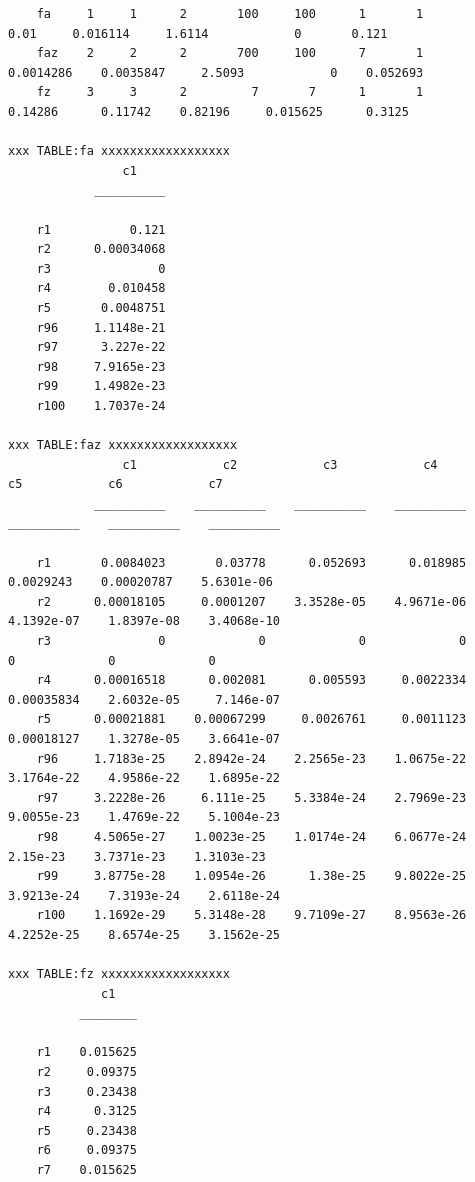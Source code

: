 \documentclass[
]{book}
\begin{document}
\begin{verbatim}
    fa     1     1      2       100     100      1       1          0.01     0.016114     1.6114            0       0.121
    faz    2     2      2       700     100      7       1     0.0014286    0.0035847     2.5093            0    0.052693
    fz     3     3      2         7       7      1       1       0.14286      0.11742    0.82196     0.015625      0.3125

xxx TABLE:fa xxxxxxxxxxxxxxxxxx
                c1    
            __________

    r1           0.121
    r2      0.00034068
    r3               0
    r4        0.010458
    r5       0.0048751
    r96     1.1148e-21
    r97      3.227e-22
    r98     7.9165e-23
    r99     1.4982e-23
    r100    1.7037e-24

xxx TABLE:faz xxxxxxxxxxxxxxxxxx
                c1            c2            c3            c4            c5            c6            c7    
            __________    __________    __________    __________    __________    __________    __________

    r1       0.0084023       0.03778      0.052693      0.018985     0.0029243    0.00020787    5.6301e-06
    r2      0.00018105     0.0001207    3.3528e-05    4.9671e-06    4.1392e-07    1.8397e-08    3.4068e-10
    r3               0             0             0             0             0             0             0
    r4      0.00016518      0.002081      0.005593     0.0022334    0.00035834    2.6032e-05     7.146e-07
    r5      0.00021881    0.00067299     0.0026761     0.0011123    0.00018127    1.3278e-05    3.6641e-07
    r96     1.7183e-25    2.8942e-24    2.2565e-23    1.0675e-22    3.1764e-22    4.9586e-22    1.6895e-22
    r97     3.2228e-26     6.111e-25    5.3384e-24    2.7969e-23    9.0055e-23    1.4769e-22    5.1004e-23
    r98     4.5065e-27    1.0023e-25    1.0174e-24    6.0677e-24      2.15e-23    3.7371e-23    1.3103e-23
    r99     3.8775e-28    1.0954e-26      1.38e-25    9.8022e-25    3.9213e-24    7.3193e-24    2.6118e-24
    r100    1.1692e-29    5.3148e-28    9.7109e-27    8.9563e-26    4.2252e-25    8.6574e-25    3.1562e-25

xxx TABLE:fz xxxxxxxxxxxxxxxxxx
             c1   
          ________

    r1    0.015625
    r2     0.09375
    r3     0.23438
    r4      0.3125
    r5     0.23438
    r6     0.09375
    r7    0.015625
\end{verbatim}
\end{document}
